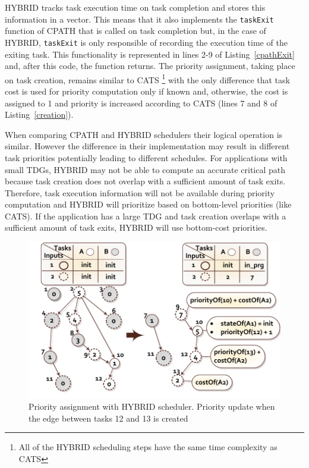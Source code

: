HYBRID tracks task execution time on task completion and stores this information in a vector.
This means that it also implements the \texttt{taskExit} function of CPATH that is called on task completion but, in the case of HYBRID, \texttt{taskExit} is only responsible of recording the execution time of the exiting task.
This functionality is represented in lines 2-9 of Listing~\ref{cpathExit} and, after this code, the function returns.
The priority assignment, taking place on task creation, remains similar to CATS \footnote{All of the HYBRID scheduling steps have the same time complexity as CATS} with the only difference that task cost is used for priority computation only if known and, otherwise, the cost is assigned to 1 and priority is increased according to CATS (lines 7 and 8 of Listing~\ref{creation}).

When comparing CPATH and HYBRID schedulers their logical operation is similar.
However the difference in their implementation may result in different task priorities potentially leading to different schedules.
For applications with small TDGs, HYBRID may not be able to compute an accurate critical path because task creation does not overlap with a sufficient amount of task exits.
Therefore, task execution information will not be available during priority computation and HYBRID will prioritize based on bottom-level priorities (like CATS).
If the application has a large TDG and task creation overlaps with a sufficient amount of task exits, HYBRID will use bottom-cost priorities.

\begin{figure}[t]
\includegraphics[width=\columnwidth]{figures/hybrid_prioritization.pdf} 
\centering
\caption{Priority assignment with HYBRID scheduler. Priority update when the edge between tasks 12 and 13 is created}
\label{hybrid_priorities}
\vspace{-0.5cm}
\end{figure} 

